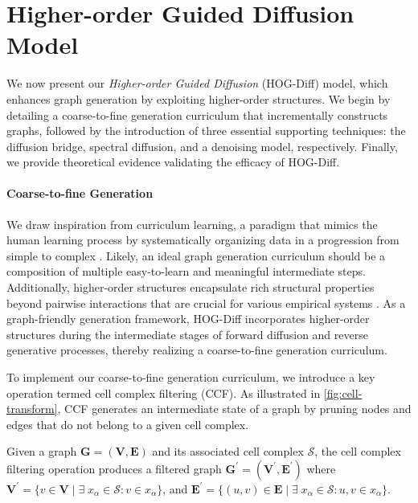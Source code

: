 \section{Higher-order Guided Diffusion Model}
We now present our \textit{Higher-order Guided Diffusion} (HOG-Diff) model, which enhances graph generation by exploiting higher-order structures. 
We begin by detailing a coarse-to-fine generation curriculum that incrementally constructs graphs, followed by the introduction of three essential supporting techniques: the diffusion bridge, spectral diffusion, and a denoising model, respectively. Finally, we provide theoretical evidence validating the efficacy of HOG-Diff.


\paragraph{Coarse-to-fine Generation}
We draw inspiration from curriculum learning, a paradigm that mimics the human learning process by systematically organizing data in a progression from simple to complex \cite{curriculum-IJCV2022}.
Likely, an ideal graph generation curriculum should be a composition of multiple easy-to-learn and meaningful intermediate steps.
Additionally, higher-order structures encapsulate rich structural properties beyond pairwise interactions that are crucial for various empirical systems \cite{HiGCN2024}. 
As a graph-friendly generation framework, HOG-Diff incorporates higher-order structures during the intermediate stages of forward diffusion and reverse generative processes, thereby realizing a coarse-to-fine generation curriculum.

To implement our coarse-to-fine generation curriculum, we introduce a key operation termed cell complex filtering (CCF).
As illustrated in \cref{fig:cell-transform}, CCF generates an intermediate state of a graph by pruning nodes and edges that do not belong to a given cell complex.

\begin{definition}
Given a graph $\bm{G} = (\bm{V},\bm{E})$ and its associated cell complex $\mathcal{S}$, the cell complex filtering operation produces a filtered graph $\bm{G}^\prime = (\bm{V}^\prime,\bm{E}^\prime)$ where 
$\bm{V}^{\prime} = \{ v \in \bm{V}  \mid \exists\;x_\alpha \in \mathcal{S} : v \in x_\alpha \}$, 
and $\bm{E}^{\prime} = \{ (u, v) \in \bm{E} \mid \exists\;x_\alpha \in \mathcal{S} : u,v \in x_\alpha\}$.
\end{definition}

